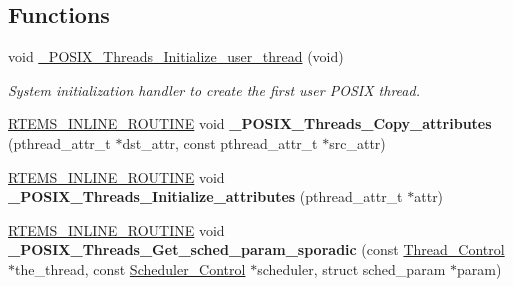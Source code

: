 \subsection*{Functions}
\begin{DoxyCompactItemize}
\item 
\mbox{\label{group__POSIX__PTHREAD_ga1695c0a5d29b5bb9c805a8a58b943214}} 
void \mbox{\hyperlink{group__POSIX__PTHREAD_ga1695c0a5d29b5bb9c805a8a58b943214}{\+\_\+\+P\+O\+S\+I\+X\+\_\+\+Threads\+\_\+\+Initialize\+\_\+user\+\_\+thread}} (void)
\begin{DoxyCompactList}\small\item\em System initialization handler to create the first user P\+O\+S\+IX thread. \end{DoxyCompactList}\item 
\mbox{\label{group__POSIX__PTHREAD_gadaec26ab44812ab08ddaddcb31eccc6d}} 
\mbox{\hyperlink{group__RTEMSScoreBaseDefs_gac216239df231d5dbd15e3520b0b9313f}{R\+T\+E\+M\+S\+\_\+\+I\+N\+L\+I\+N\+E\+\_\+\+R\+O\+U\+T\+I\+NE}} void {\bfseries \+\_\+\+P\+O\+S\+I\+X\+\_\+\+Threads\+\_\+\+Copy\+\_\+attributes} (pthread\+\_\+attr\+\_\+t $\ast$dst\+\_\+attr, const pthread\+\_\+attr\+\_\+t $\ast$src\+\_\+attr)
\item 
\mbox{\label{group__POSIX__PTHREAD_gad911da6e53e7d3cf5271ac937b78e0f1}} 
\mbox{\hyperlink{group__RTEMSScoreBaseDefs_gac216239df231d5dbd15e3520b0b9313f}{R\+T\+E\+M\+S\+\_\+\+I\+N\+L\+I\+N\+E\+\_\+\+R\+O\+U\+T\+I\+NE}} void {\bfseries \+\_\+\+P\+O\+S\+I\+X\+\_\+\+Threads\+\_\+\+Initialize\+\_\+attributes} (pthread\+\_\+attr\+\_\+t $\ast$attr)
\item 
\mbox{\label{group__POSIX__PTHREAD_gae1ea059cc5dcc2ab7b9e5467a4d546c0}} 
\mbox{\hyperlink{group__RTEMSScoreBaseDefs_gac216239df231d5dbd15e3520b0b9313f}{R\+T\+E\+M\+S\+\_\+\+I\+N\+L\+I\+N\+E\+\_\+\+R\+O\+U\+T\+I\+NE}} void {\bfseries \+\_\+\+P\+O\+S\+I\+X\+\_\+\+Threads\+\_\+\+Get\+\_\+sched\+\_\+param\+\_\+sporadic} (const \mbox{\hyperlink{struct__Thread__Control}{Thread\+\_\+\+Control}} $\ast$the\+\_\+thread, const \mbox{\hyperlink{struct__Scheduler__Control}{Scheduler\+\_\+\+Control}} $\ast$scheduler, struct sched\+\_\+param $\ast$param)
\item 
\mbox{\label{group__POSIX__PTHREAD_gaecec3c7778cbf1c19527c4c88ae6fd76}} 

\end{DoxyCompactItemize}
